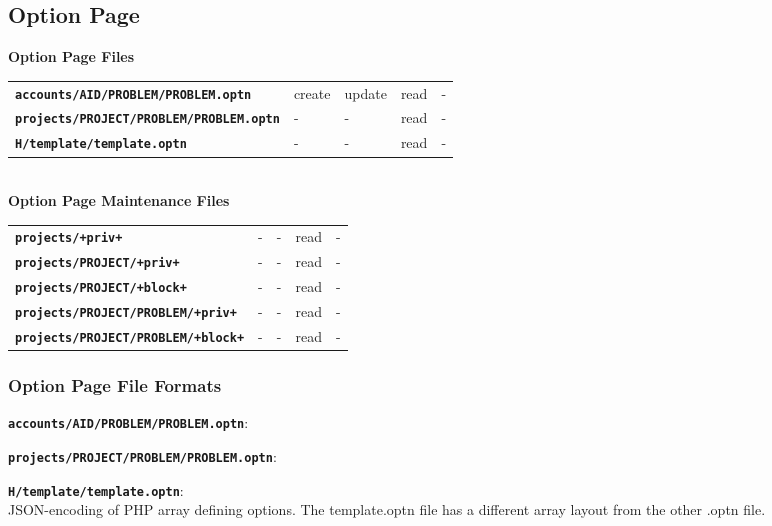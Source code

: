 \documentclass[12pt]{article}
\newenvironment{indpar}[1][0.4in]%
	{\begin{list}{}%
		     {\setlength{\itemsep}{0in}%
		      \setlength{\topsep}{0in}%
		      \setlength{\parsep}{1ex}%
		      \setlength{\labelwidth}{#1}%
		      \setlength{\leftmargin}{#1}%
		      \addtolength{\leftmargin}{\labelsep}}%
	 \item}%
	{\end{list}}
\newenvironment{itemlist}[1][0.2in]%
	{\begin{list}{}{\setlength{\labelwidth}{#1}%
		        \setlength{\leftmargin}{\labelwidth}%
		        \addtolength{\leftmargin}{+0.2in}%
		        \addtolength{\linewidth}{-\labelwidth}%
		        \addtolength{\linewidth}{-0.2in}%
		        \renewcommand{\makelabel}[1]{##1\hfill}}
	 \raggedright}%
	{\end{list}}
\newcommand{\TT}[1]{{\tt \bfseries #1}}
\begin{document}
\newpage

\subsection{Option Page}

\begin{center}
{\bf Option Page Files}
\\[1ex]
\begin{tabular}{lllll}
\TT{accounts/AID/PROBLEM/PROBLEM.optn}  & create  & update & read & - \\
\TT{projects/PROJECT/PROBLEM/PROBLEM.optn} & -  & -  & read & - \\
\TT{H/template/template.optn} & -  & -  & read & - \\
\end{tabular}
\\\bigskip
{\bf Option Page Maintenance Files}
\\[1ex]
\begin{tabular}{lllll}
\TT{projects/+priv+}			& -  & - & read & - \\
\TT{projects/PROJECT/+priv+}		& -  & - & read & - \\
\TT{projects/PROJECT/+block+}		& -  & - & read & - \\
\TT{projects/PROJECT/PROBLEM/+priv+}	& -  & - & read & - \\
\TT{projects/PROJECT/PROBLEM/+block+}	& -  & - & read & - \\
\end{tabular}
\end{center}

\subsubsection{Option Page File Formats}

\begin{indpar}
\begin{itemlist}
\item[\TT{accounts/AID/PROBLEM/PROBLEM.optn}:]
\item[\TT{projects/PROJECT/PROBLEM/PROBLEM.optn}:]\vspace*{-1ex}
\item[\TT{H/template/template.optn}:]\vspace*{-1ex} ~
\label{PROBLEM.OPTN} \\
    JSON-encoding of PHP array defining options.
    The template.optn file has a different array layout
    from the other .optn file.
\end{itemlist}
\end{indpar}
\end{document}
